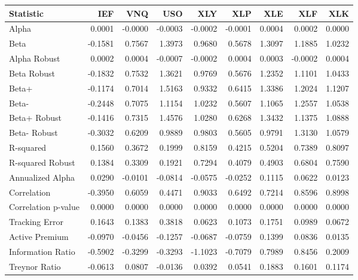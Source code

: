 \begin{tabular}{lrrrrrrrr}
\toprule
Statistic & IEF & VNQ & USO & XLY & XLP & XLE & XLF & XLK \\
\midrule
Alpha & 0.0001 & -0.0000 & -0.0003 & -0.0002 & -0.0001 & 0.0004 & 0.0002 & 0.0000 \\
Beta & -0.1581 & 0.7567 & 1.3973 & 0.9680 & 0.5678 & 1.3097 & 1.1885 & 1.0232 \\
Alpha Robust & 0.0002 & 0.0004 & -0.0007 & -0.0002 & 0.0004 & 0.0003 & -0.0002 & 0.0004 \\
Beta Robust & -0.1832 & 0.7532 & 1.3621 & 0.9769 & 0.5676 & 1.2352 & 1.1101 & 1.0433 \\
Beta+ & -0.1174 & 0.7014 & 1.5163 & 0.9332 & 0.6415 & 1.3386 & 1.2024 & 1.1207 \\
Beta- & -0.2448 & 0.7075 & 1.1154 & 1.0232 & 0.5607 & 1.1065 & 1.2557 & 1.0538 \\
Beta+ Robust & -0.1416 & 0.7315 & 1.4576 & 1.0280 & 0.6268 & 1.3432 & 1.1375 & 1.0888 \\
Beta- Robust & -0.3032 & 0.6209 & 0.9889 & 0.9803 & 0.5605 & 0.9791 & 1.3130 & 1.0579 \\
R-squared & 0.1560 & 0.3672 & 0.1999 & 0.8159 & 0.4215 & 0.5204 & 0.7389 & 0.8097 \\
R-squared Robust & 0.1384 & 0.3309 & 0.1921 & 0.7294 & 0.4079 & 0.4903 & 0.6804 & 0.7590 \\
Annualized Alpha & 0.0290 & -0.0101 & -0.0814 & -0.0575 & -0.0252 & 0.1115 & 0.0622 & 0.0123 \\
Correlation & -0.3950 & 0.6059 & 0.4471 & 0.9033 & 0.6492 & 0.7214 & 0.8596 & 0.8998 \\
Correlation p-value & 0.0000 & 0.0000 & 0.0000 & 0.0000 & 0.0000 & 0.0000 & 0.0000 & 0.0000 \\
Tracking Error & 0.1643 & 0.1383 & 0.3818 & 0.0623 & 0.1073 & 0.1751 & 0.0989 & 0.0672 \\
Active Premium & -0.0970 & -0.0456 & -0.1257 & -0.0687 & -0.0759 & 0.1399 & 0.0836 & 0.0135 \\
Information Ratio & -0.5902 & -0.3299 & -0.3293 & -1.1023 & -0.7079 & 0.7989 & 0.8456 & 0.2009 \\
Treynor Ratio & -0.0613 & 0.0807 & -0.0136 & 0.0392 & 0.0541 & 0.1883 & 0.1601 & 0.1174 \\
\bottomrule
\end{tabular}
